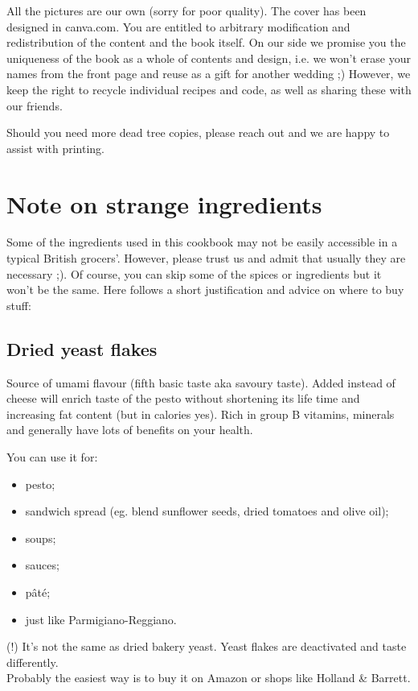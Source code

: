 All the pictures are our own (sorry for poor quality).
The cover has been designed in canva.com.
You are entitled to arbitrary modification and redistribution of the content and the book itself.
On our side we promise you the uniqueness of the book as a whole of contents and design,
i.e. we won't erase your names from the front page and reuse as a gift for another wedding ;)
However, we keep the right to recycle individual recipes and code,
as well as sharing these with our friends.

Should you need more dead tree copies, please reach out and we are happy to assist with printing.

\section*{Note on strange ingredients}

Some of the ingredients used in this cookbook may not be easily accessible in a typical British grocers'. However, please trust us and admit that usually they are necessary ;). Of course, you can skip some of the spices or ingredients but it won't be the same. Here follows a short justification and advice on where to buy stuff: 

\subsection*{Dried yeast flakes}

Source of umami flavour (fifth basic taste aka savoury taste). Added instead of cheese will enrich taste of the pesto without shortening its life time and increasing fat content (but in calories yes). Rich in group B vitamins, minerals and generally have lots of benefits on your health. 

You can use it for:

\begin{itemize}
    \setlength\itemsep{0.1mm}
    \item pesto;
    \item sandwich spread (eg. blend sunflower seeds, dried tomatoes and olive oil);
    \item soups;
    \item sauces; 
    \item pâté;
    \item just like Parmigiano-Reggiano.
\end{itemize}

(!) It's not the same as dried bakery yeast.
Yeast flakes are deactivated and taste differently.
\\
Probably the easiest way is to buy it on Amazon or shops like Holland \& Barrett.

